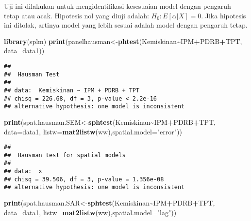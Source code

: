 \documentclass[
]{book}
\newenvironment{Shaded}{\begin{snugshade}}{\end{snugshade}}
\newcommand{\DataTypeTok}[1]{\textcolor[rgb]{0.13,0.29,0.53}{#1}}
\newcommand{\KeywordTok}[1]{\textcolor[rgb]{0.13,0.29,0.53}{\textbf{#1}}}
\newcommand{\NormalTok}[1]{#1}
\newcommand{\OperatorTok}[1]{\textcolor[rgb]{0.81,0.36,0.00}{\textbf{#1}}}
\newcommand{\StringTok}[1]{\textcolor[rgb]{0.31,0.60,0.02}{#1}}
\begin{document}
Uji ini dilakukan untuk mengidentifikasi kesesuaian model dengan pengaruh tetap atau acak. Hipotesis nol yang diuji adalah: \(H_0: E[\alpha|X]=0\). Jika hipotesis ini ditolak, artinya model yang lebih sesuai adalah model dengan pengaruh tetap.

\begin{Shaded}
\begin{Highlighting}[]
\KeywordTok{library}\NormalTok{(splm)}
\KeywordTok{print}\NormalTok{(panelhausman\textless{}{-}}\KeywordTok{phtest}\NormalTok{(Kemiskinan}\OperatorTok{\textasciitilde{}}\NormalTok{IPM}\OperatorTok{+}\NormalTok{PDRB}\OperatorTok{+}\NormalTok{TPT, }\DataTypeTok{data=}\NormalTok{data1))}
\end{Highlighting}
\end{Shaded}

\begin{verbatim}
## 
##  Hausman Test
## 
## data:  Kemiskinan ~ IPM + PDRB + TPT
## chisq = 226.68, df = 3, p-value < 2.2e-16
## alternative hypothesis: one model is inconsistent
\end{verbatim}

\begin{Shaded}
\begin{Highlighting}[]
\KeywordTok{print}\NormalTok{(spat.hausman.SEM\textless{}{-}}\KeywordTok{sphtest}\NormalTok{(Kemiskinan}\OperatorTok{\textasciitilde{}}\NormalTok{IPM}\OperatorTok{+}\NormalTok{PDRB}\OperatorTok{+}\NormalTok{TPT, }\DataTypeTok{data=}\NormalTok{data1, }\DataTypeTok{listw=}\KeywordTok{mat2listw}\NormalTok{(ww),}\DataTypeTok{spatial.model=}\StringTok{"error"}\NormalTok{))}
\end{Highlighting}
\end{Shaded}

\begin{verbatim}
## 
##  Hausman test for spatial models
## 
## data:  x
## chisq = 39.506, df = 3, p-value = 1.356e-08
## alternative hypothesis: one model is inconsistent
\end{verbatim}

\begin{Shaded}
\begin{Highlighting}[]
\KeywordTok{print}\NormalTok{(spat.hausman.SAR\textless{}{-}}\KeywordTok{sphtest}\NormalTok{(Kemiskinan}\OperatorTok{\textasciitilde{}}\NormalTok{IPM}\OperatorTok{+}\NormalTok{PDRB}\OperatorTok{+}\NormalTok{TPT, }\DataTypeTok{data=}\NormalTok{data1, }\DataTypeTok{listw=}\KeywordTok{mat2listw}\NormalTok{(ww),}\DataTypeTok{spatial.model=}\StringTok{"lag"}\NormalTok{))}
\end{Highlighting}
\end{Shaded}
\end{document}
